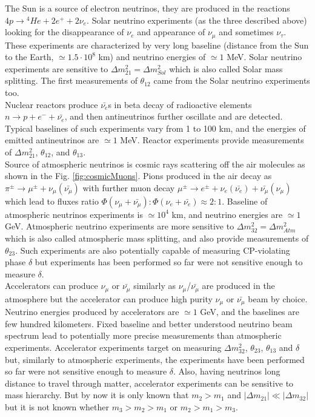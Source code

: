 The Sun is a source of electron neutrinos, they are produced in the reactions $4p \rightarrow {^4}He+2e^{+}+2\nu_{e}$. Solar neutrino experiments (as the three described above) looking for the disappearance of $\nu_e$ and appearance of $\nu_\mu$ and sometimes $\nu_\tau$. These experiments are characterized by very long baseline (distance from the Sun to the Earth, $\simeq 1.5 \cdot 10^8$ km) and neutrino energies of $\simeq 1$ MeV. Solar neutrino experiments are sensitive to ${\Delta}m^2_{21}={\Delta}m^2_{Sol}$ which is also called Solar mass splitting. The first measurements of $\theta_{12}$ came from the Solar neutrino experiments too.\\

Nuclear reactors produce $\bar{\nu_e}$s in beta decay of radioactive elements $n \rightarrow p + e^- + \bar{\nu_e}$, and then antineutrinos further oscillate and are detected. Typical baselines of such experiments vary from 1 to 100 km, and the energies of emitted antineutrinos are $\simeq 1$ MeV. Reactor experiments provide measurements of ${\Delta}m^2_{21}$, $\theta_{12}$, and $\theta_{13}$.\\

Source of atmospheric neutrinos is cosmic rays scattering off the air molecules as shown in the Fig. \ref{fig:cosmicMuons}. Pions produced in the air decay as $\pi^{\pm} \rightarrow \mu^{\pm}+\nu_\mu(\bar{\nu_\mu})$ with further muon decay $\mu^{\pm} \rightarrow e^{\pm}+\nu_e(\bar{\nu_e})+\bar{\nu_\mu}(\nu_\mu)$ which lead to fluxes ratio $\Phi(\nu_\mu+\bar{\nu_\mu}):\Phi(\nu_e+\bar{\nu_e}) \approx 2:1$. Baseline of atmospheric neutrinos experiments is $\simeq 10^4$ km, and neutrino energies are $\simeq 1$ GeV. Atmospheric neutrino experiments are more sensitive to ${\Delta}m^2_{32}={\Delta}m^2_{Atm}$ which is also called atmospheric mass splitting, and also provide measurements of $\theta_{23}$. Such experiments are also potentially capable of measuring CP-violating phase $\delta$ but experiments has been performed so far were not sensitive enough to measure $\delta$. \\

Accelerators can produce $\nu_\mu$ or $\bar{\nu_\mu}$ similarly as $\nu_\mu$/$\bar{\nu_\mu}$ are produced in the atmosphere but the accelerator can produce high purity $\nu_\mu$ or $\bar{\nu_\mu}$ beam by choice. Neutrino energies produced by accelerators are $\simeq 1$ GeV, and the baselines are few hundred kilometers. Fixed baseline and better understood neutrino beam spectrum lead to potentially more precise measurements than atmospheric experiments. Accelerator experiments target on measuring ${\Delta}m^2_{32}$, $\theta_{23}$, $\theta_{13}$ and $\delta$ but, similarly to atmospheric experiments, the experiments have been performed so far were not sensitive enough to measure $\delta$. Also, having neutrinos long distance to travel through matter, accelerator experiments can be sensitive to mass hierarchy. But by now it is only known that $m_2>m_1$ and $|{\Delta}m_{21}| \ll |{\Delta}m_{32}|$ but it is not known whether $m_3>m_2>m_1$ or $m_2>m_1>m_3$.\\ 

